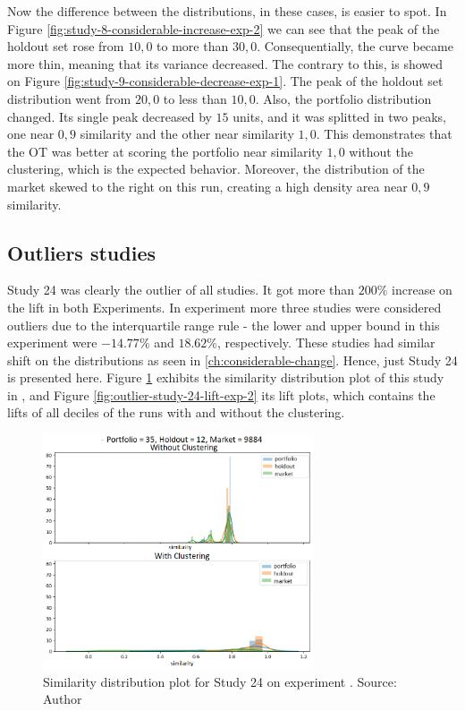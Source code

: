 Now the difference between the distributions, in these cases, is easier to spot. In Figure \ref{fig:study-8-considerable-increase-exp-2} we can see that the peak of the holdout set rose from $10,0$ to more than $30,0$. Consequentially, the curve became more thin, meaning that its variance decreased. The contrary to this, is showed on Figure \ref{fig:study-9-considerable-decrease-exp-1}. The peak of the holdout set distribution went from $20,0$ to less than $10,0$. Also, the portfolio distribution changed. Its single peak decreased by $15$ units, and it was splitted in two peaks, one near $0,9$ similarity and the other near similarity $1,0$. This demonstrates that the OT was better at scoring the portfolio near similarity $1,0$ without the clustering, which is the expected behavior. Moreover, the distribution of the market skewed to the right on this run, creating a high density area near $0,9$ similarity. 

\subsection{Outliers studies}
\label{ch:outliers}

Study 24 was clearly the outlier of all studies. It got more than $200\%$ increase on the lift in both Experiments. In experiment \nameExperimentII{} more three studies were considered outliers due to the interquartile range rule - the lower and upper bound in this experiment were $-14.77\%$ and $18.62\%$, respectively. These studies had similar shift on the distributions as seen in \ref{ch:considerable-change}. Hence, just Study 24 is presented here. Figure \ref{fig:outlier-study-24-exp-2} exhibits the similarity distribution plot of this study in \nameExperimentII{}, and Figure \ref{fig:outlier-study-24-lift-exp-2} its lift plots, which contains the lifts of all deciles of the runs with and without the clustering.

\begin{figure}[!ht]
   \centering
   \includegraphics[width=8cm]{fig/ch4-outlier-study-24-exp-2.png}
   \caption{Similarity distribution plot for Study 24 on experiment \nameExperimentII{}. Source: Author}
   \label{fig:outlier-study-24-exp-2}
\end{figure}

